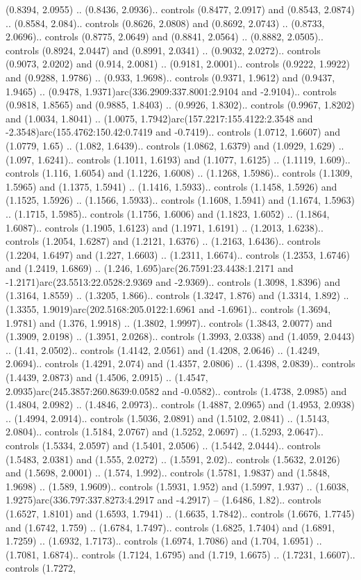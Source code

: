 (0.8394, 2.0955) .. (0.8436, 2.0936).. controls (0.8477, 2.0917) and (0.8543, 2.0874) .. (0.8584, 2.084).. controls (0.8626, 2.0808) and (0.8692, 2.0743) .. (0.8733, 2.0696).. controls (0.8775, 2.0649) and (0.8841, 2.0564) .. (0.8882, 2.0505).. controls (0.8924, 2.0447) and (0.8991, 2.0341) .. (0.9032, 2.0272).. controls (0.9073, 2.0202) and (0.914, 2.0081) .. (0.9181, 2.0001).. controls (0.9222, 1.9922) and (0.9288, 1.9786) .. (0.933, 1.9698).. controls (0.9371, 1.9612) and (0.9437, 1.9465) .. (0.9478, 1.9371)arc(336.2909:337.8001:2.9104 and -2.9104).. controls (0.9818, 1.8565) and (0.9885, 1.8403) .. (0.9926, 1.8302).. controls (0.9967, 1.8202) and (1.0034, 1.8041) .. (1.0075, 1.7942)arc(157.2217:155.4122:2.3548 and -2.3548)arc(155.4762:150.42:0.7419 and -0.7419).. controls (1.0712, 1.6607) and (1.0779, 1.65) .. (1.082, 1.6439).. controls (1.0862, 1.6379) and (1.0929, 1.629) .. (1.097, 1.6241).. controls (1.1011, 1.6193) and (1.1077, 1.6125) .. (1.1119, 1.609).. controls (1.116, 1.6054) and (1.1226, 1.6008) .. (1.1268, 1.5986).. controls (1.1309, 1.5965) and (1.1375, 1.5941) .. (1.1416, 1.5933).. controls (1.1458, 1.5926) and (1.1525, 1.5926) .. (1.1566, 1.5933).. controls (1.1608, 1.5941) and (1.1674, 1.5963) .. (1.1715, 1.5985).. controls (1.1756, 1.6006) and (1.1823, 1.6052) .. (1.1864, 1.6087).. controls (1.1905, 1.6123) and (1.1971, 1.6191) .. (1.2013, 1.6238).. controls (1.2054, 1.6287) and (1.2121, 1.6376) .. (1.2163, 1.6436).. controls (1.2204, 1.6497) and (1.227, 1.6603) .. (1.2311, 1.6674).. controls (1.2353, 1.6746) and (1.2419, 1.6869) .. (1.246, 1.695)arc(26.7591:23.4438:1.2171 and -1.2171)arc(23.5513:22.0528:2.9369 and -2.9369).. controls (1.3098, 1.8396) and (1.3164, 1.8559) .. (1.3205, 1.866).. controls (1.3247, 1.876) and (1.3314, 1.892) .. (1.3355, 1.9019)arc(202.5168:205.0122:1.6961 and -1.6961).. controls (1.3694, 1.9781) and (1.376, 1.9918) .. (1.3802, 1.9997).. controls (1.3843, 2.0077) and (1.3909, 2.0198) .. (1.3951, 2.0268).. controls (1.3993, 2.0338) and (1.4059, 2.0443) .. (1.41, 2.0502).. controls (1.4142, 2.0561) and (1.4208, 2.0646) .. (1.4249, 2.0694).. controls (1.4291, 2.074) and (1.4357, 2.0806) .. (1.4398, 2.0839).. controls (1.4439, 2.0873) and (1.4506, 2.0915) .. (1.4547, 2.0935)arc(245.3857:260.8639:0.0582 and -0.0582).. controls (1.4738, 2.0985) and (1.4804, 2.0982) .. (1.4846, 2.0973).. controls (1.4887, 2.0965) and (1.4953, 2.0938) .. (1.4994, 2.0914).. controls (1.5036, 2.0891) and (1.5102, 2.0841) .. (1.5143, 2.0804).. controls (1.5184, 2.0767) and (1.5252, 2.0697) .. (1.5293, 2.0647).. controls (1.5334, 2.0597) and (1.5401, 2.0506) .. (1.5442, 2.0444).. controls (1.5483, 2.0381) and (1.555, 2.0272) .. (1.5591, 2.02).. controls (1.5632, 2.0126) and (1.5698, 2.0001) .. (1.574, 1.992).. controls (1.5781, 1.9837) and (1.5848, 1.9698) .. (1.589, 1.9609).. controls (1.5931, 1.952) and (1.5997, 1.937) .. (1.6038, 1.9275)arc(336.797:337.8273:4.2917 and -4.2917) -- (1.6486, 1.82).. controls (1.6527, 1.8101) and (1.6593, 1.7941) .. (1.6635, 1.7842).. controls (1.6676, 1.7745) and (1.6742, 1.759) .. (1.6784, 1.7497).. controls (1.6825, 1.7404) and (1.6891, 1.7259) .. (1.6932, 1.7173).. controls (1.6974, 1.7086) and (1.704, 1.6951) .. (1.7081, 1.6874).. controls (1.7124, 1.6795) and (1.719, 1.6675) .. (1.7231, 1.6607).. controls (1.7272, 